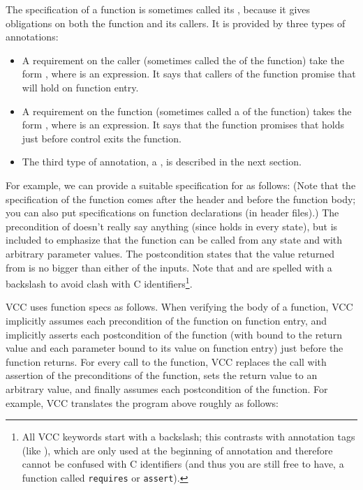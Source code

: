 The specification of a function is sometimes called its ,
because it gives obligations on both the function and its callers. It
is provided by three types of annotations:
\begin{itemize}
\item A requirement on the caller (sometimes called the
   of the function) take the form , 
  where  is an expression. It says that callers of the
  function promise that  will hold on function entry. 

\item A requirement on the function (sometimes called a
   of the function) takes the form , 
  where  is an expression. It says that the function
  promises that  holds just before control exits the
  function. 

\item The third type of annotation, a , is described
  in the next section.
\end{itemize}

For example, we can provide a suitable specification for  as
follows:
\noindent
(Note that the specification of the function comes after the header and
before the function body; you can also put specifications on function
declarations (\eg in header files).)
The precondition  of  doesn't
really say anything (since \vcc{\true} holds in every state), but is included
to emphasize that the function can be called from any state and
with arbitrary parameter values.
The postcondition states that the value returned from  
is no bigger than either of the inputs.
Note that \vcc{\true} and \vcc{\result} are spelled with a backslash
to avoid clash with C identifiers\footnote{
  All VCC keywords start with a backslash; 
  this contrasts with annotation tags (like ),
  which are only used at the beginning of annotation
  and therefore cannot be confused with C identifiers
  (and thus you are still free to have, \eg
  a function called \lstinline{requires} or \lstinline{assert}).}.

VCC uses function specs as follows. When verifying the body of a
function, VCC implicitly assumes each precondition of the function on
function entry, and implicitly asserts each postcondition of the
function (with \vcc{\result} bound to the return value and each
parameter bound to its value on function entry) just before the
function returns. For every call to the function, VCC replaces the
call with assertion of the preconditions of the function, sets the
return value to an arbitrary value, and finally assumes each
postcondition of the function. 
For example, VCC translates the program above roughly as follows:

